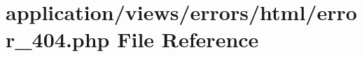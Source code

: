 \hypertarget{html_2error__404_8php}{}\section{application/views/errors/html/error\+\_\+404.php File Reference}
\label{html_2error__404_8php}
